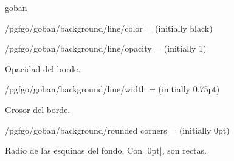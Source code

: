 \begin{environment}{{goban}}
\begin{key}{/pgfgo/goban/background/line/color = (initially black)}
\begin{codeexample}[]
			\begin{goban}[background = {line = {color = blue}}, resume = a]
			\end{goban}
		\end{codeexample}		
	\end{key}
	
	\begin{key}{/pgfgo/goban/background/line/opacity = (initially 1)}
		
		Opacidad del borde.
		
		\begin{codeexample}[]
			
			\begin{goban}[background = {line = {color = red}}, name = a]
			\end{goban}
			
			\begin{goban}[resume = a,
				background = {line = {color = red}, line = {opacity = 0.5}}]
			\end{goban}
		\end{codeexample}
	\end{key}
	
	\begin{key}{/pgfgo/goban/background/line/width = (initially 0.75pt)}
		
		Grosor del borde.
		
		\begin{codeexample}[]
			
			\begin{goban}[name = a]
			\end{goban}
			
			\begin{goban}[background = {line = {width = 1.5pt}}, resume = a]
			\end{goban}
		\end{codeexample}
	\end{key}
	
	\begin{key}{/pgfgo/goban/background/rounded corners = (initially 0pt)}
		
		Radio de las esquinas del fondo. Con |0pt|, son rectas.
		
		\begin{codeexample}[]
			

\end{codeexample}
\end{key}
\end{environment}
